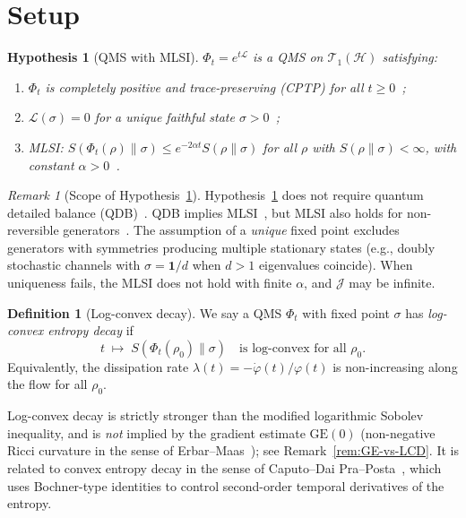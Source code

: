 \documentclass[11pt,a4paper]{article}
\newtheorem{hypothesis}[theorem]{Hypothesis}
\theoremstyle{definition}
\newtheorem{definition}[theorem]{Definition}
\theoremstyle{remark}
\newtheorem{remark}[theorem]{Remark}
\newcommand{\HH}{\mathcal{H}}
\newcommand{\TT}{\mathcal{T}}
\newcommand{\LL}{\mathcal{L}}
\newcommand{\GE}{\mathrm{GE}}
\begin{document}
\section{Setup}\label{sec:setup}

\begin{hypothesis}[QMS with MLSI]\label{hyp:MLSI}
$\Phi_t = e^{t\LL}$ is a QMS on $\TT_1(\HH)$ satisfying:
\begin{enumerate}[label=\textup{(\roman*)}]
  \item $\Phi_t$ is completely positive and trace-preserving (CPTP)
  for all $t \ge 0$~\cite{Lindblad1976,GKS1976};
  \item $\LL(\sigma) = 0$ for a unique faithful state
  $\sigma > 0$~\cite{Spohn1977,FagnolaRebolledo2003};
  \item MLSI: $S(\Phi_t(\rho)\|\sigma) \le e^{-2\alpha t}
  S(\rho\|\sigma)$ for all $\rho$ with $S(\rho\|\sigma) < \infty$,
  with constant $\alpha > 0$~\cite{KastoryanoTemme2013,MullerHermesFranca2018,OlkiewiczZegarlinski1999}.
\end{enumerate}
\end{hypothesis}

\begin{remark}[Scope of Hypothesis~\ref{hyp:MLSI}]\label{rem:scope}
Hypothesis~\ref{hyp:MLSI} does not require quantum detailed balance
(QDB)~\cite{Alicki1976,Frigerio1977,Frigerio1978}.  QDB implies
MLSI~\cite{CarlenMaas2017}, but MLSI also holds for non-reversible
generators~\cite{Bardet2024,BardetRouze2023}.  The assumption of a
\emph{unique} fixed point excludes generators with symmetries
producing multiple stationary states (e.g., doubly stochastic
channels with $\sigma = \mathbf{1}/d$ when $d > 1$ eigenvalues
coincide).  When uniqueness fails, the MLSI does not hold with finite
$\alpha$, and $\mathcal{J}$ may be infinite.
\end{remark}

\begin{definition}[Log-convex decay]\label{def:LCD}
We say a QMS $\Phi_t$ with fixed point $\sigma$ has
\emph{log-convex entropy decay} if
\begin{equation}\label{eq:LCD}
  t \;\mapsto\; S(\Phi_t(\rho_0)\|\sigma)
  \quad\text{is log-convex for all } \rho_0.
\end{equation}
Equivalently, the dissipation rate
$\lambda(t) = -\dot\varphi(t)/\varphi(t)$ is non-increasing
along the flow for all $\rho_0$.

Log-convex decay is strictly stronger than the
modified logarithmic Sobolev inequality, and is \emph{not}
implied by the gradient estimate $\GE(0)$
(non-negative Ricci curvature in the sense of
Erbar--Maas~\cite{ErbarMaas2012,Mielke2013,WirthZhang2021}); see
Remark~\ref{rem:GE-vs-LCD}.  It is related to convex entropy
decay in the sense of Caputo--Dai
Pra--Posta~\cite{CaputoDaiPraPosta2009},
which uses Bochner-type identities to control second-order
temporal derivatives of the entropy.
\end{definition}
\end{document}
